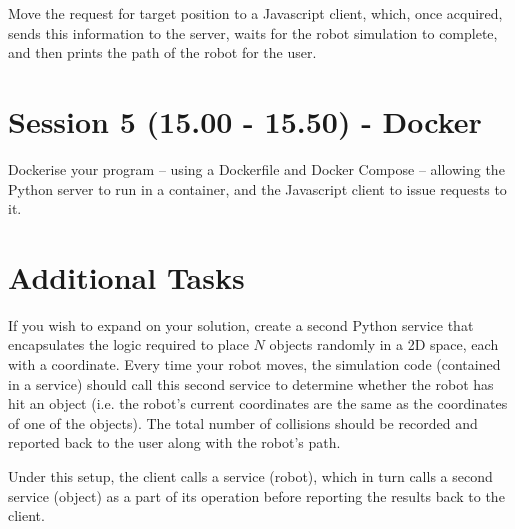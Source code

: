 \documentclass{article}
\begin{document}
Move the request for target position to a Javascript client, which, once acquired, sends this information to the server, waits for the robot simulation to complete, and then prints the path of the robot for the user.

\section{Session 5 (15.00 - 15.50) - Docker}

Dockerise your program -- using a Dockerfile and Docker Compose -- allowing the Python server to run in a container, and the Javascript client to issue requests to it.

\section{Additional Tasks}

If you wish to expand on your solution, create a second Python service that encapsulates the logic required to place $N$ objects randomly in a 2D space, each with a coordinate. 
Every time your robot moves, the simulation code (contained in a service) should call this second service to determine whether the robot has hit an object (i.e. the robot's current coordinates are the same as the coordinates of one of the objects).
The total number of collisions should be recorded and reported back to the user along with the robot's path.

Under this setup, the client calls a service (robot), which in turn calls a second service (object) as a part of its operation before reporting the results back to the client.
\end{document}
